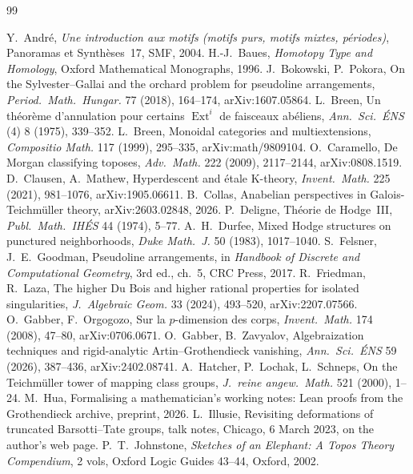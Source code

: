 \documentclass[11pt]{article}
\newcommand{\Ext}{\operatorname{Ext}}
\theoremstyle{definition}
\theoremstyle{plain}\newtheorem*{proposition}{Proposition}\theoremstyle{definition}
\begin{document}
\begin{thebibliography}{99}

 Y.~André, \emph{Une introduction aux motifs (motifs purs, motifs mixtes, périodes)}, Panoramas et Synthèses~17, SMF, 2004.
 H.-J.~Baues, \emph{Homotopy Type and Homology}, Oxford Mathematical Monographs, 1996.
 J.~Bokowski, P.~Pokora, On the Sylvester--Gallai and the orchard problem for pseudoline arrangements, \emph{Period.\ Math.\ Hungar.} 77 (2018), 164--174, arXiv:1607.05864.
 L.~Breen, Un théorème d'annulation pour certains $\Ext^i$ de faisceaux abéliens, \emph{Ann.\ Sci.\ ÉNS} (4) 8 (1975), 339--352.
 L.~Breen, Monoidal categories and multiextensions, \emph{Compositio Math.} 117 (1999), 295--335, arXiv:math/9809104.
 O.~Caramello, De Morgan classifying toposes, \emph{Adv.\ Math.} 222 (2009), 2117--2144, arXiv:0808.1519.
 D.~Clausen, A.~Mathew, Hyperdescent and étale K-theory, \emph{Invent.\ Math.} 225 (2021), 981--1076, arXiv:1905.06611.
 B.~Collas, Anabelian perspectives in Galois-Teichmüller theory, arXiv:2603.02848, 2026.
 P.~Deligne, Théorie de Hodge~III, \emph{Publ.\ Math.\ IHÉS} 44 (1974), 5--77.
 A.~H.~Durfee, Mixed Hodge structures on punctured neighborhoods, \emph{Duke Math.\ J.} 50 (1983), 1017--1040.
 S.~Felsner, J.~E.~Goodman, Pseudoline arrangements, in \emph{Handbook of Discrete and Computational Geometry}, 3rd ed., ch.~5, CRC Press, 2017.
 R.~Friedman, R.~Laza, The higher Du Bois and higher rational properties for isolated singularities, \emph{J.\ Algebraic Geom.} 33 (2024), 493--520, arXiv:2207.07566.
 O.~Gabber, F.~Orgogozo, Sur la $p$-dimension des corps, \emph{Invent.\ Math.} 174 (2008), 47--80, arXiv:0706.0671.
 O.~Gabber, B.~Zavyalov, Algebraization techniques and rigid-analytic Artin--Grothendieck vanishing, \emph{Ann.\ Sci.\ ÉNS} 59 (2026), 387--436, arXiv:2402.08741.
 A.~Hatcher, P.~Lochak, L.~Schneps, On the Teichmüller tower of mapping class groups, \emph{J.\ reine angew.\ Math.} 521 (2000), 1--24.
 M.~Hua, Formalising a mathematician's working notes: Lean proofs from the Grothendieck archive, preprint, 2026.
 L.~Illusie, Revisiting deformations of truncated Barsotti--Tate groups, talk notes, Chicago, 6 March 2023, on the author's web page.
 P.~T.~Johnstone, \emph{Sketches of an Elephant: A Topos Theory Compendium}, 2 vols, Oxford Logic Guides 43--44, Oxford, 2002.

\end{thebibliography}
\end{document}
